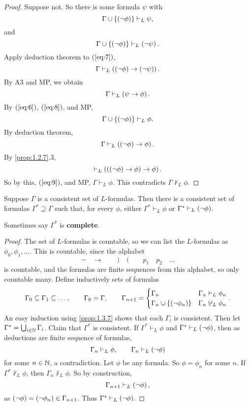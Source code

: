 \begin{proof}
Suppose not. So there is some formula $ \psi $ with
\begin{equation}
\label{eq:6}
\Gamma \cup \left\{ \left( \neg \phi \right) \right\} \vdash_L \psi,
\end{equation}
and
\begin{equation}
\label{eq:7}
\Gamma \cup \left\{ \left( \neg \phi \right) \right\} \vdash_L \left( \neg \psi \right).
\end{equation}
Apply deduction theorem to $ \left( \ref{eq:7} \right) $,
$$ \Gamma \vdash_L \left( \left( \neg \phi \right) \rightarrow \left( \neg \psi \right) \right). $$
By A3 and MP, we obtain
\begin{equation}
\label{eq:8}
\Gamma \vdash_L \left( \psi \rightarrow \phi \right).
\end{equation}
By $ \left( \ref{eq:6} \right) $, $ \left( \ref{eq:8} \right) $, and MP,
$$ \Gamma \cup \left\{ \left( \neg \phi \right) \right\} \vdash_L \phi. $$
By deduction theorem,
\begin{equation}
\label{eq:9}
\Gamma \vdash_L \left( \left( \neg \phi \right) \rightarrow \phi \right).
\end{equation}
By \ref{prop:1.2.7}.$ 3 $,
$$ \vdash_L \left( \left( \left( \neg \phi \right) \rightarrow \phi \right) \rightarrow \phi \right). $$
So by this, $ \left( \ref{eq:9} \right) $, and MP, $ \Gamma \vdash_L \phi $. This contradicts $ \Gamma \not\vdash_L \phi $.
\end{proof}

\begin{proposition}
\label{prop:1.3.8}
Suppose $ \Gamma $ is a consistent set of $ L $-formulas. Then there is a consistent set of formulas $ \Gamma^* \supseteq \Gamma $ such that, for every $ \phi $, either $ \Gamma^* \vdash_L \phi $ or $ \Gamma^* \vdash_L \left( \neg \phi \right) $.
\end{proposition}

Sometimes say $ \Gamma^* $ is \textbf{complete}.

\begin{proof}
The set of $ L $-formulas is countable, so we can list the $ L $-formulas as $ \phi_0, \phi_1, \dots $. This is countable, since the alphabet
$$ \neg \quad \rightarrow \qquad ) \quad ( \qquad p_1 \quad p_2 \quad \dots $$
is countable, and the formulas are finite sequences from this alphabet, so only countable many. Define inductively sets of formulas
$$ \Gamma_0 \subseteq \Gamma_1 \subseteq \dots, \qquad \Gamma_0 = \Gamma, \qquad \Gamma_{n + 1} = \begin{cases}
\Gamma_n & \Gamma_n \vdash_L \phi_n \\
\Gamma_n \cup \left\{ \left( \neg \phi_n \right) \right\} & \Gamma_n \not\vdash_L \phi_n
\end{cases}. $$
An easy induction using \ref{prop:1.3.7} shows that each $ \Gamma_i $ is consistent. Then let $ \Gamma^* = \bigcup_{i \in \mathbb{N}} \Gamma_i $. Claim that $ \Gamma^* $ is consistent. If $ \Gamma^* \vdash_L \phi $ and $ \Gamma^* \vdash_L \left( \neg \phi \right) $, then as deductions are finite sequence of formulas,
$$ \Gamma_n \vdash_L \phi, \qquad \Gamma_n \vdash_L \left( \neg \phi \right) $$
for some $ n \in \mathbb{N} $, a contradiction. Let $ \phi $ be any formula. So $ \phi = \phi_n $ for some $ n $. If $ \Gamma^* \not\vdash_L \phi $, then $ \Gamma_n \not\vdash_L \phi $. So by construction,
$$ \Gamma_{n + 1} \vdash_L \left( \neg \phi \right), $$
as $ \left( \neg \phi \right) = \left( \neg \phi_n \right) \in \Gamma_{n + 1} $. Thus $ \Gamma^* \vdash_L \left( \neg \phi \right) $.
\end{proof}

